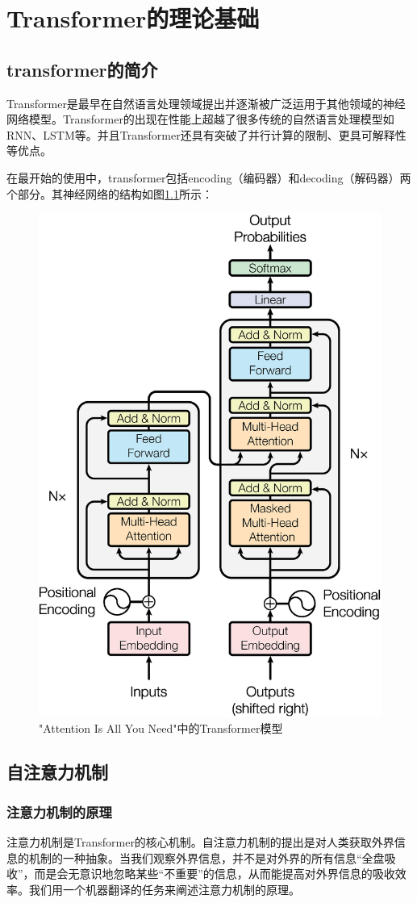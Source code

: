 \chapter{Transformer的理论基础}


\label{cha:sysu-thesis-latex-install-guide}
\section{transformer的简介}

Transformer是最早在自然语言处理领域提出并逐渐被广泛运用于其他领域的神经网络模型。Transformer的出现在性能上超越了很多传统的自然语言处理模型如RNN、LSTM等。并且Transformer还具有突破了并行计算的限制、更具可解释性等优点。

在最开始的使用中，transformer包括encoding（编码器）和decoding（解码器）两个部分。其神经网络的结构如图\ref{img301}所示：

\begin{figure}[h]
	\centering
	\includegraphics[width=0.4\columnwidth]{image/chap03/img301.png}
	\caption{"Attention Is All You Need"中的Transformer模型\cite{vaswani2017attention}}
	\label{img301}
\end{figure}

\section{自注意力机制}
\subsection{注意力机制的原理}
注意力机制是Transformer的核心机制。自注意力机制的提出是对人类获取外界信息的机制的一种抽象。当我们观察外界信息，并不是对外界的所有信息“全盘吸收”，而是会无意识地忽略某些“不重要”的信息，从而能提高对外界信息的吸收效率。我们用一个机器翻译的任务来阐述注意力机制的原理。

